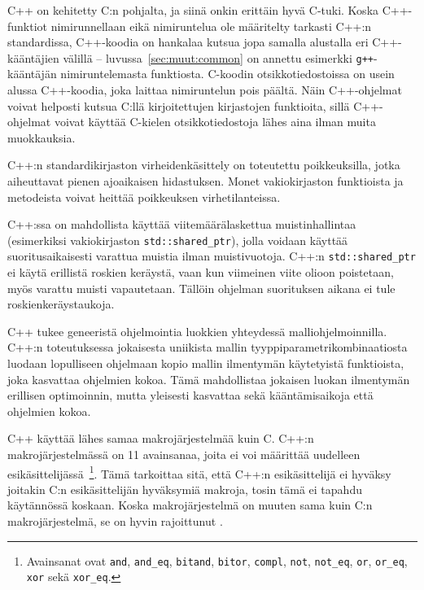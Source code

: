 C++ on kehitetty C:n pohjalta, ja siinä onkin erittäin hyvä C-tuki. Koska
C++\hyp{}funktiot nimirunnellaan eikä nimiruntelua ole määritelty tarkasti C++:n
standardissa, C++-koodia on hankalaa kutsua jopa samalla alustalla eri
C++-kääntäjien välillä -- luvussa~\ref{sec:muut:common} on annettu esimerkki
\texttt{g++}-kääntäjän nimiruntelemasta funktiosta. C-koodin
otsikkotiedostoissa on usein alussa C++-koodia, joka
laittaa nimiruntelun pois päältä. Näin C++-ohjelmat voivat helposti kutsua
C:llä kirjoitettujen kirjastojen funktioita, sillä C++-ohjelmat voivat käyttää
C-kielen otsikkotiedostoja lähes aina ilman muita muokkauksia.

C++:n standardikirjaston virheidenkäsittely on toteutettu poikkeuksilla, jotka
aiheuttavat pienen ajoaikaisen hidastuksen. Monet vakiokirjaston funktioista ja
metodeista voivat heittää poikkeuksen virhetilanteissa.

C++:ssa on mahdollista käyttää viitemäärälaskettua
muistinhallintaa (esimerkiksi vakiokirjaston \texttt{std::shared\_ptr}), jolla
voidaan käyttää suoritusaikaisesti varattua muistia ilman muistivuotoja. C++:n
\texttt{std::shared\_ptr} ei käytä erillistä roskien keräystä, vaan kun
viimeinen viite olioon poistetaan, myös varattu muisti vapautetaan. Tällöin
ohjelman suorituksen aikana ei tule roskienkeräystaukoja.

C++ tukee geneeristä ohjelmointia luokkien
yhteydessä malliohjelmoinnilla. C++:n
toteutuksessa jokaisesta uniikista mallin tyyppiparametrikombinaatiosta luodaan
lopulliseen ohjelmaan kopio mallin ilmentymän käytetyistä
funktioista, joka kasvattaa ohjelmien kokoa. Tämä mahdollistaa jokaisen luokan
ilmentymän erillisen optimoinnin, mutta yleisesti kasvattaa sekä
kääntämisaikoja että ohjelmien kokoa.

C++ käyttää lähes samaa makrojärjestelmää kuin C. C++:n makrojärjestelmässä on
11 avainsanaa, joita ei voi määrittää uudelleen
esikäsittelijässä~\citep[luku~19.2]{CPP17}\footnote{ Avainsanat ovat
\texttt{and}, \texttt{and\_eq}, \texttt{bitand}, \texttt{bitor},
\texttt{compl}, \texttt{not}, \texttt{not\_eq}, \texttt{or}, \texttt{or\_eq},
\texttt{xor} sekä \texttt{xor\_eq}. }. Tämä tarkoittaa sitä, että C++:n
esikäsittelijä ei hyväksy joitakin C:n esikäsittelijän hyväksymiä makroja,
tosin tämä ei tapahdu käytännössä koskaan. Koska makrojärjestelmä on muuten
sama kuin C:n makrojärjestelmä, se on hyvin rajoittunut \citep[luku~19]{CPP17}.

